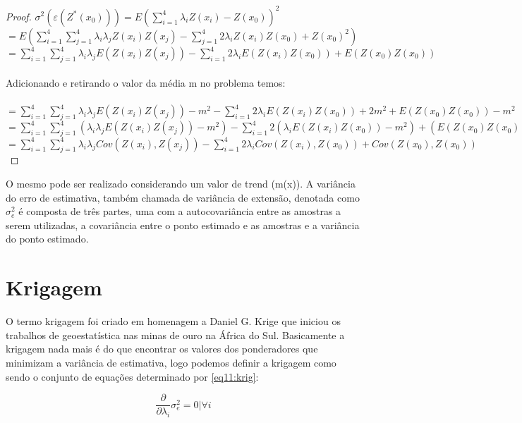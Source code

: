 \begin{proof}
$\sigma ^2\left (  \varepsilon (Z^{*}(x_{0})) \right )= E\left (\sum_{i=1}^{4}\lambda _{i}Z(x_{i}) -Z(x_{0}) \right )^2$
\\
$= E\left (\sum_{i=1}^{4}\sum_{j=1}^{4}\lambda _{i}\lambda _{j}Z(x_{i})Z(x_{j}) -\sum_{j=1}^{4}2\lambda _{i}Z(x_{i})Z(x_{0}) +Z(x_{0})^2 \right)$
\\
$= \sum_{i=1}^{4}\sum_{j=1}^{4}\lambda _{i}\lambda _{j}E(Z(x_{i})Z(x_{j})) -\sum_{i=1}^{4}2\lambda _{i}E(Z(x_{i})Z(x_{0})) +E(Z(x_{0})Z(x_{0}))$
\\ \\
Adicionando e retirando o valor da média m no problema temos:\\ \\
$= \sum_{i=1}^{4}\sum_{j=1}^{4}\lambda _{i}\lambda _{j}E(Z(x_{i})Z(x_{j}))-m^2 -\sum_{i=1}^{4}2\lambda _{i}E(Z(x_{i})Z(x_{0})) + 2m^2 +E(Z(x_{0})Z(x_{0})) -m^2$
\\
$= \sum_{i=1}^{4}\sum_{j=1}^{4}(\lambda _{i}\lambda _{j}E(Z(x_{i})Z(x_{j}))-m^2) -\sum_{i=1}^{4}2(\lambda _{i}E(Z(x_{i})Z(x_{0})) - m^2) +(E(Z(x_{0})Z(x_{0})) -m^2)$
\\
$= \sum_{i=1}^{4}\sum_{j=1}^{4}\lambda _{i}\lambda _{j}Cov(Z(x_{i}),Z(x_{j}))-\sum_{i=1}^{4}2\lambda _{i}Cov(Z(x_{i}),Z(x_{0}))+Cov(Z(x_{0}),Z(x_{0}))$

\end{proof}

O mesmo pode ser realizado considerando um valor de trend (m(x)). A variância do erro de estimativa, também chamada de variância de extensão, denotada como $\sigma^{2}_{e}$ é composta de três partes, uma com a autocovariância entre as amostras a serem utilizadas, a covariância entre o ponto estimado e as amostras e a variância do ponto estimado. 

\section{Krigagem}

O termo krigagem foi criado em homenagem a Daniel G. Krige que iniciou os trabalhos de geoestatística nas minas de ouro na África do Sul. Basicamente a krigagem nada mais é do que encontrar os valores dos ponderadores que minimizam a variância de estimativa, logo podemos definir a krigagem como sendo o conjunto de equações determinado por \eqref{eq11:krig}:

\begin{equation}\label{eq11:krig}
\frac{\partial }{\partial \lambda _{i}} \sigma ^{2}_{e}=0|\forall i  
\end{equation}

